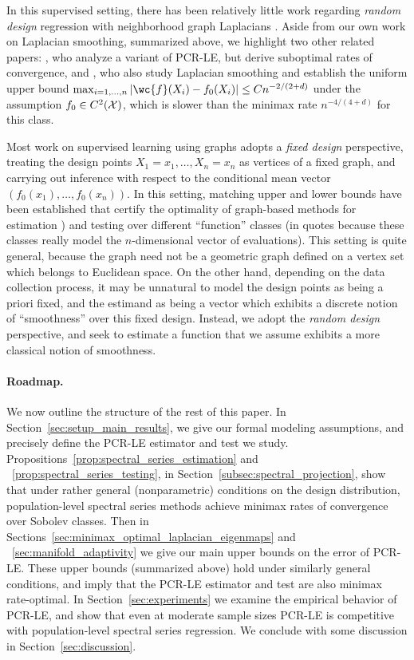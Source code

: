 In this supervised setting, there has been relatively little work regarding \emph{random design} regression with neighborhood graph Laplacians . Aside from our own work on Laplacian smoothing, summarized above, we highlight two other related papers: \citet{lee2016}, who analyze a variant of PCR-LE, but derive suboptimal rates of convergence, and \citet{trillos2020}, who also study Laplacian smoothing and establish the uniform upper bound $\max_{i = 1,\ldots,n}|\wc{f}(X_i) - f_0(X_i)| \leq C n^{-2/(2 + d)}$ under the assumption $f_0 \in C^2(\mathcal{X})$, which is slower than the minimax rate $n^{-4/(4 + d)}$ for this class. 

Most work on supervised learning using graphs adopts a \emph{fixed design} perspective, treating the design points $X_1 = x_1,\ldots,X_n = x_n$ as vertices of a fixed graph, and carrying out inference with respect to the conditional mean vector $(f_0(x_1),\ldots,f_0(x_n))$. In this setting, matching upper and lower bounds have been established that certify the optimality of graph-based methods for estimation \citep{wang2016,hutter2016,sadhanala16,sadhanala17,kirichenko2017,kirichenko2018}) and testing \citep{sharpnack2010identifying,sharpnack2013b,sharpnack2013,sharpnack2015} over different ``function'' classes (in quotes because these classes really model the $n$-dimensional vector of evaluations). This setting is quite general, because the graph need not be a geometric graph defined on a vertex set which belongs to Euclidean space. On the other hand, depending on the data collection process, it may be unnatural to model the design points as being a priori fixed, and the estimand as being a vector which exhibits a discrete notion of ``smoothness'' over this fixed design. Instead, we adopt the \emph{random design} perspective, and seek to estimate a function that we assume exhibits a more classical notion of smoothness. 

\paragraph{Roadmap.}
We now outline the structure of the rest of this paper. In Section~\ref{sec:setup_main_results}, we give our formal modeling assumptions, and precisely define the PCR-LE estimator and test we study. Propositions~\ref{prop:spectral_series_estimation} and ~\ref{prop:spectral_series_testing}, in Section~\ref{subsec:spectral_projection}, show that under rather general (nonparametric) conditions on the design distribution, population-level spectral series methods achieve minimax rates of convergence over Sobolev classes. Then in Sections~\ref{sec:minimax_optimal_laplacian_eigenmaps} and ~\ref{sec:manifold_adaptivity} we give our main upper bounds on the error of PCR-LE. These upper bounds (summarized above) hold under similarly general conditions, and imply that the PCR-LE estimator and test are also minimax rate-optimal. In Section~\ref{sec:experiments} we examine the empirical behavior of PCR-LE, and show that even at moderate sample sizes PCR-LE is competitive with population-level spectral series regression. We conclude with some discussion in Section~\ref{sec:discussion}. 

